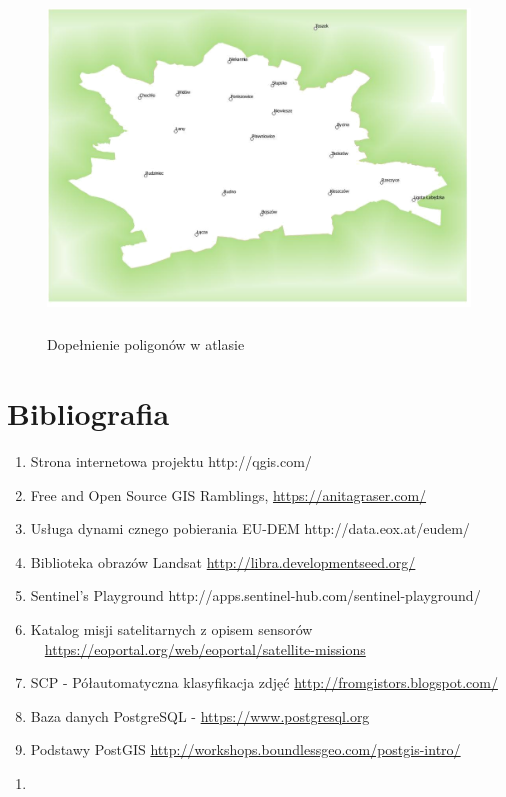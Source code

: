 \documentclass[12pt,a4paper]{book}
\begin{document}
\begin{center}
\begin{figure}
\includegraphics[width=13cm,height=9.176cm]{008-atlas-dopelnienie.png}
\caption{Dopełnienie poligonów w atlasie}
\end{figure}
\end{center}

\section{Bibliografia}
\begin{enumerate}
\item Strona internetowa projektu http://qgis.com/
\item Free and Open Source GIS Ramblings, \url{https://anitagraser.com/}
\item Usługa dynami cznego pobierania EU-DEM http://data.eox.at/eudem/
\item Biblioteka obrazów Landsat \url{http://libra.developmentseed.org/}
\item Sentinel’s Playground http://apps.sentinel-hub.com/sentinel-playground/
\item Katalog misji satelitarnych z opisem sensorów \ \ \url{https://eoportal.org/web/eoportal/satellite-missions}
\item SCP - Półautomatyczna klasyfikacja zdjęć \url{http://fromgistors.blogspot.com/}
\item Baza danych PostgreSQL - \url{https://www.postgresql.org}
\item Podstawy PostGIS \url{http://workshops.boundlessgeo.com/postgis-intro/}
\end{enumerate}
\setcounter{tocdepth}{10}
\renewcommand\contentsname{Spis treści}
\tableofcontents
\begin{enumerate}
\item[] \end{enumerate}
\end{document}
